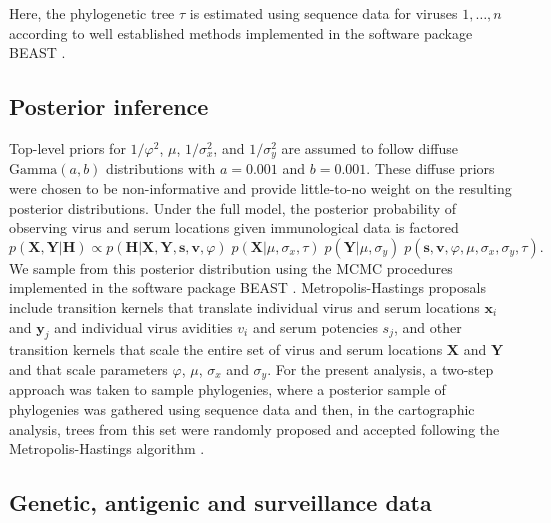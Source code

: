\documentclass[11pt,oneside,letterpaper]{article}
\newcommand{\virus}{\mathbf{x}}						%
\newcommand{\serum}{\mathbf{y}}						%
\newcommand{\viruses}{\mathbf{X}}					%
\newcommand{\sera}{\mathbf{Y}}						%
\newcommand{\ve}{v}									%
\newcommand{\se}{s}									%
\newcommand{\ves}{\mathbf{v}}						%
\newcommand{\ses}{\mathbf{s}}						%
\newcommand{\mdssd}{\varphi}						%
\newcommand{\virussd}{\sigma_x}						%
\newcommand{\serumsd}{\sigma_y}						%
\newcommand{\drift}{\mu}							%
\newcommand{\tree}{\tau}							%
\newcommand{\vn}{n}									%
\begin{document}
Here, the phylogenetic tree $\tree$ is estimated using sequence data for viruses $1,\ldots,\vn$ according to well established methods implemented in the software package BEAST \cite{BEAST17}.

\subsection*{Posterior inference}

Top-level priors for $1/\mdssd^2$, $\drift$, $1/\virussd^2$, and $1/\serumsd^2$ are assumed to follow diffuse $\mbox{Gamma}(a, b)$ distributions  with $a=0.001$ and $b=0.001$.
These diffuse priors were chosen to be non-informative and provide little-to-no weight on the resulting posterior distributions.
Under the full model, the posterior probability of observing virus and serum locations given immunological data is factored
\begin{equation}
	p(\viruses,\sera | \mathbf{H}) \propto p(\mathbf{H} | \viruses, \sera, \ses, \ves, \mdssd) \; 
	p(\viruses | \drift, \virussd, \tree) \;
	p(\sera | \drift, \serumsd) \; 
	p(\ses, \ves, \mdssd, \drift, \virussd, \serumsd, \tree).
\end{equation}
We sample from this posterior distribution using the MCMC procedures implemented in the software package BEAST \cite{BEAST17}.
Metropolis-Hastings proposals include transition kernels that translate individual virus and serum locations $\virus_i$ and $\serum_j$ and individual virus avidities $\ve_i$ and serum potencies $\se_j$, and other transition kernels that scale the entire set of virus and serum locations $\viruses$ and $\sera$ and that scale parameters $\mdssd$, $\drift$, $\virussd$ and $\serumsd$.
For the present analysis, a two-step approach was taken to sample phylogenies, where a posterior sample of phylogenies was gathered using sequence data and then, in the cartographic analysis, trees from this set were randomly proposed and accepted following the Metropolis-Hastings algorithm \cite{Pagel04}.

\subsection*{Genetic, antigenic and surveillance data}
\end{document}
